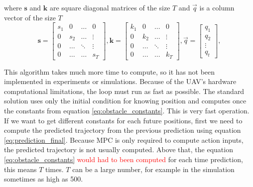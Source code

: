 \documentclass{article}
\begin{document}
where $\textbf{s}$ and $\textbf{k}$ are square diagonal matrices of the size $T$ and $\vec{q}$ is a column vector of the size $T$
\begin{equation}
\label{eq:obstacle_constants_matrices}
\textbf{s} = \begin{bmatrix}
s_1 & 0 & \hdots & 0 \\
0 & s_2 & \hdots & \vdots \\
0 & \hdots & \ddots & \vdots \\
0 & \hdots & \hdots & s_T
\end{bmatrix},
\textbf{k} = \begin{bmatrix}
k_1 & 0 & \hdots & 0 \\
0 & k_2 & \hdots & \vdots \\
0 & \hdots & \ddots & \vdots \\
0 & \hdots & \hdots & k_T
\end{bmatrix},
\vec{q} = \begin{bmatrix}
q_1 \\
q_2 \\
\vdots \\
q_t
\end{bmatrix},
\end{equation}

This algorithm takes much more time to compute, so it has not been implemented in experiments or simulations. Because of the UAV's hardware computational limitations, the loop must run as fast as possible. The standard solution uses only the initial condition for knowing position and computes once the constants from equation \ref{eq:obstacle_constants}. This is very fast operation. If we want to get different constants for each future positions, first we need to compute the predicted trajectory from the previous prediction using equation \ref{eq:prediction_final}. Because MPC is only required to compute action inputs, the predicted trajectory is not usually computed. Above that, the equation \ref{eq:obstacle_constants} \textcolor{red}{would had to been computed} for each time prediction, this means $T$ times. $T$ can be a large number, for example in the simulation sometimes as high as 500.
\end{document}
